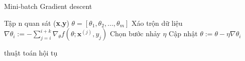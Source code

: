 \begin{algorithm}[H]
\label{alg:minibatch}
\caption{Mini-batch Gradient descent}
\begin{algorithmic}[1]
\REQUIRE Tập n quan sát (\textbf{x},\textbf{y})
\REQUIRE $\theta=[\theta_1,\theta_2,...,\theta_m]$
\REPEAT 
\STATE Xáo trộn dữ liệu
\STATE $\nabla \theta_i := -\sum^{i+k}_{j=i} \nabla_{\theta}f(\theta;\textbf{x}^{(j)},y_j)$
\STATE Chọn bước nhảy $\eta$
\STATE Cập nhật $\theta := \theta - \eta\nabla\theta_i$
	\STATE {}
\ENDIF

\ENDFOR

\UNTIL	thuật toán hội tụ
\end{algorithmic} 

\end{algorithm}

